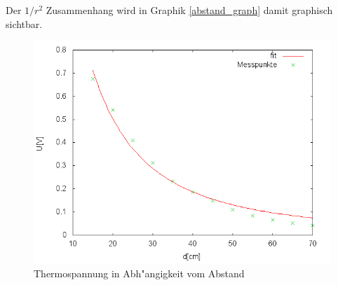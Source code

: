 	Der $1/r^2$ Zusammenhang wird in Graphik \eqref{abstand_graph} damit graphisch sichtbar.

	\begin{figure}[htbp]
		\centering
		\includegraphics[width = 12cm]{img/abstand.png}
		\caption{Thermospannung in Abh"angigkeit vom Abstand}
		\label{abstand_graph}
	\end{figure}

	
